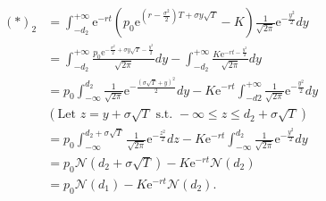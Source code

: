 \documentclass[oneside,titlepage,headinclude,12pt,a4paper,BCOR5mm,footinclude]{book}
\theoremstyle{defn}
\newcommand{\eexp}{\mathrm{e}}
\begin{document}
  \begin{align*}
    (*)_2 & = \int_{-d_2}^{+\infty} \eexp^{-rt} \left( p_0 \eexp^{\left(r-\frac{\sigma^2}{2}\right)T + \sigma y\sqrt{T}}-K\right)
      \frac{1}{\sqrt{2\pi}} \eexp^{-\frac{y^2}{2}} dy
      \\ & = \int_{-d_2}^{+\infty} \frac{p_0 \eexp^{-\frac{\sigma^2}{2} + \sigma y\sqrt{T} -\frac{y^2}{2}}}{\sqrt{2\pi}} dy
      - \int_{-d_2}^{+\infty} \frac{K\eexp^{-rt -\frac{y^2}{2}}}{\sqrt{2\pi}}dy
      \\ & = p_0 \int_{-\infty}^{d_2} \frac{1}{\sqrt{2\pi}} \eexp^{-\frac{(\sigma\sqrt{T}+y)^2}{2}}dy
      - K\eexp^{-rt}\int_{-d2}^{+\infty} \frac{1}{\sqrt{2\pi}} \eexp^{-\frac{y^2}{2}} dy
      \\ & \left(\text{Let } z=y+\sigma\sqrt{T} \text{ s.t. } -\infty\leq z \leq d_2+\sigma\sqrt{T}\right)
      \\ & = p_0 \int_{-\infty}^{d_2+\sigma\sqrt{T}} \frac{1}{\sqrt{2\pi}} \eexp^{-\frac{z^2}{2}} dz
      - K\eexp^{-rt}\int_{-\infty}^{d_2} \frac{1}{\sqrt{2\pi}} \eexp^{-\frac{y^2}{2}} dy
      \\ & = p_0 \mathcal{N}(d_2 + \sigma\sqrt{T}) - K\eexp^{-rt} \mathcal{N}(d_2)
      \\ & = p_0 \mathcal{N}(d_1) - K\eexp^{-rt}\mathcal{N}(d_2).
  \end{align*}
\end{document}
